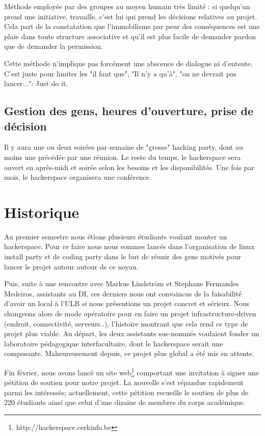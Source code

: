 \documentclass{article}
\begin{document}
Méthode employée par des groupes au moyen humain très limité : si quelqu'un prend 
une initiative, travaille, c'est lui qui prend les décisions relatives au projet. 
Cela part de la constatation que l'immobilisme par peur des conséquences est une 
plaie dans toute structure associative et qu'il est plus facile de demander pardon 
que de demander la permission.

Cette méthode n'implique pas forcément une abscence de dialogue ni d'entente. 
C'est juste pour limiter les "il faut que", "Il n'y a qu'à", "on ne devrait pas lancer...": Just do it.

\subsection{Gestion des gens, heures d'ouverture, prise de décision}

Il y aura une ou deux soirées par semaine de "grosse" hacking party, dont au moins 
une précédée par une réunion.
Le reste du temps, le hackerspace sera ouvert en après-midi et soirée selon les 
besoins et les disponibilités.
Une fois par mois, le hackerspace organisera une conférence.

\newpage
\section{Historique}

Au premier semestre nous étions plusieurs étudiants voulant monter un hackerspace.
Pour ce faire nous nous sommes lancés dans l'organisation de linux install party et
de coding party dans le but de réunir des gens motivés pour lancer le projet autour
autour de ce noyau.

Puis, suite à une rencontre avec Markus Lindström et Stephane Fermandes Medeiros, assistants au DI, ces derniers nous ont convaincus de la faisabilité d'avoir un local à
l'ULB si nous présentions un projet concret et sérieux. Nous changeons alors de mode
opératoire pour en faire un projet infrastructure-driven (endroit, connectivité, serveurs..),
l'histoire montrant que cela rend ce type de projet plus viable.  Au départ, les deux
assistants  sus-nommés voulaient fonder un laboratoire pédagogique interfacultaire,
dont le hackerspace serait une composante. Maheureusement depuis, ce projet plus
global a été mis en attente.

Fin février, nous avons lancé un site web\footnote{http://hackerspace.cerkinfo.be} comportant
une invitation à signer une pétition de soutien pour notre projet. La nouvelle s'est répandue rapidement parmi les intéressés; actuellement, cette pétition recueille le soutien de plus de 220 étudiants ainsi que celui d'une dizaine de membres du corps académique.
\end{document}
